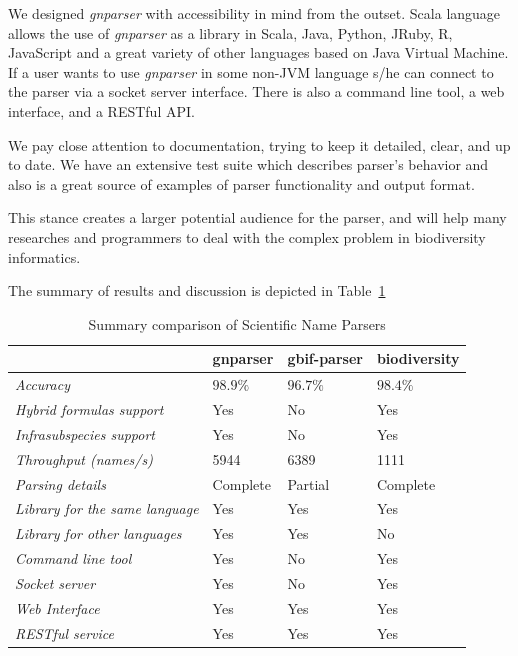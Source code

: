 \documentclass{bmcart}
\begin{document}
We designed \textit{gnparser} with accessibility in mind from the outset. Scala
language allows the use of \textit{gnparser} as a library in Scala, Java,
Python, JRuby, R, JavaScript and a great variety of other languages based on
Java Virtual Machine. If a user wants to use \textit{gnparser}  in some non-JVM
language s/he can connect to the parser via a socket server interface. There is
also a command line tool, a web interface, and a RESTful API.

We pay close attention to documentation, trying to keep it detailed, clear, and
up to date. We have an extensive test suite which describes parser's behavior
and also is a great source of examples of parser  functionality and output
format.

This stance creates a larger potential audience for the parser, and will help
many researches and programmers to deal with the complex problem in
biodiversity informatics.

The summary of results and discussion is depicted in
Table~\ref{table:summary}

\begin{table}[htb]
  \begin{center}
    \caption{Summary comparison of Scientific Name Parsers}
    \label{table:summary}
    \resizebox{12.5cm}{!} {
    \begin{tabular}{|l|*{3}{l}|}
      \hline
                             & gnparser & gbif-parser & biodiversity \\
      \hline
      \textit{Accuracy}                     & $98.9\%$ & $96.7\%$ & $98.4\%$\\
      \textit{Hybrid formulas support}      & Yes      & No       & Yes     \\
      \textit{Infrasubspecies support}      & Yes      & No       & Yes     \\
      \textit{Throughput (names/s)}         & 5944     & 6389     & 1111    \\
      \textit{Parsing details}              & Complete & Partial  & Complete\\
      \textit{Library for the same language}& Yes      & Yes      & Yes     \\
      \textit{Library for other languages}  & Yes      & Yes      & No      \\
      \textit{Command line tool}            & Yes      & No       & Yes     \\
      \textit{Socket server}                & Yes      & No       & Yes     \\
      \textit{Web Interface}                & Yes      & Yes      & Yes     \\
      \textit{RESTful service}              & Yes      & Yes      & Yes     \\
      \hline
    \end{tabular}
  }
  \end{center}
\end{table}
\end{document}
